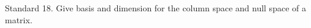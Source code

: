 Standard 18.	Give basis and dimension for the column space and null space of a matrix.



\ifprintanswers
\else %
 \newpage
\fi

\begin{solution}

\end{solution}